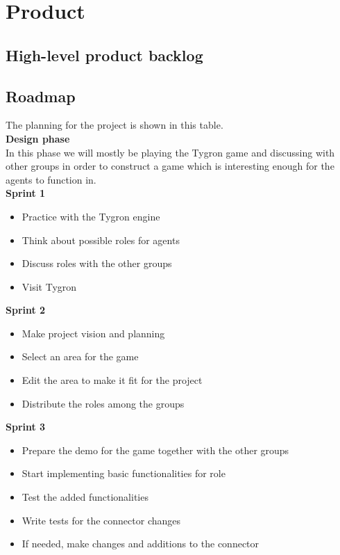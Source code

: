 \section{Product}
\subsection{High-level product backlog}
\subsection{Roadmap}
The planning for the project is shown in this table.\\

\textbf{Design phase}\\

In this phase we will mostly be playing the Tygron game and discussing with other groups in order to construct a game which is interesting enough for the agents to function in.\\

\textbf{Sprint 1}

\begin{itemize}
  \item Practice with the Tygron engine
  \item Think about possible roles for agents
  \item Discuss roles with the other groups
  \item Visit Tygron\\
\end{itemize}

\textbf{Sprint 2}

\begin{itemize}
  \item Make project vision and planning
  \item Select an area for the game
  \item Edit the area to make it fit for the project
  \item Distribute the roles among the groups\\
\end{itemize}

\textbf{Sprint 3}

\begin{itemize}
  \item Prepare the demo for the game together with the other groups
  \item Start implementing basic functionalities for role
  \item Test the added functionalities
  \item Write tests for the connector changes
  \item If needed, make changes and additions to the connector\\\\
\end{itemize}

